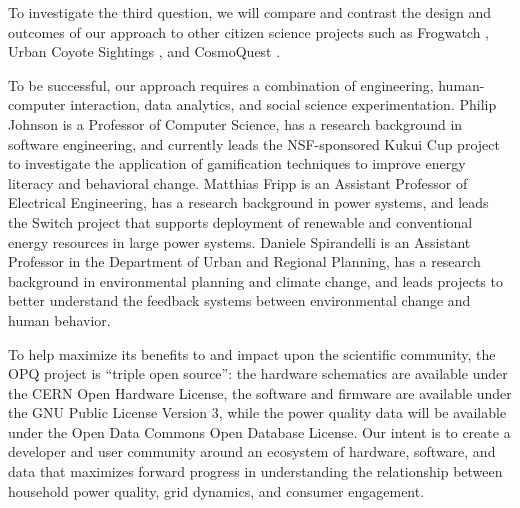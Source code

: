 To investigate the third question, we will compare and contrast the design and outcomes of our approach to other citizen science projects such as Frogwatch \cite{frogwatch}, Urban Coyote Sightings \cite{urbancoyote}, and CosmoQuest \cite{cosmoquest}.

To be successful, our approach requires a combination of engineering, human-computer interaction, data analytics, and social science experimentation.  Philip Johnson is a Professor of Computer Science, has a research background in software engineering, and currently leads the NSF-sponsored Kukui Cup project \cite{kukuicup} to investigate the application of gamification techniques to improve energy literacy and behavioral change. Matthias Fripp is an Assistant Professor of Electrical Engineering, has a research background in power systems, and leads the Switch project \cite{switch} that supports deployment of renewable and conventional energy resources in large power systems. Daniele Spirandelli is an Assistant Professor in the Department of Urban and Regional Planning, has a research background in environmental planning and climate change, and leads projects to better understand the feedback systems between environmental change and human behavior. 

To help maximize its benefits to and impact upon the scientific community, the OPQ project is ``triple open source'': the hardware schematics are available under the CERN Open Hardware License, the software and firmware are available under the GNU Public License Version 3, while the power quality data will be available under the Open Data Commons Open Database License.  Our intent is to create a developer and user community around an ecosystem of hardware, software, and data that maximizes forward progress in understanding the relationship between household power quality, grid dynamics, and consumer engagement.





